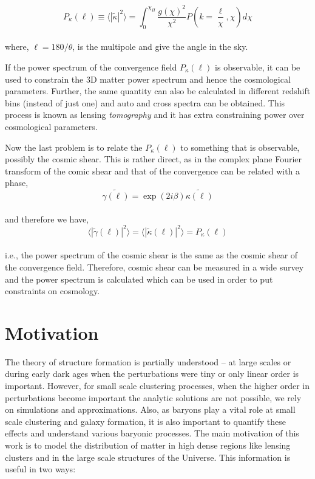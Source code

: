 \begin{equation}
	P_{\kappa}(\ell) \equiv \langle |\tilde{\kappa}|^2 \rangle = 
			\int_0^{\chi_H} \dfrac{g(\chi)^2}{\chi^2} 
			P\left(k=\dfrac{\ell}{\chi},\chi \right) d\chi
\end{equation}
\\
where, $\ell = 180/\theta$, is the multipole and give the angle in the sky. 

If the power spectrum of the convergence field $P_{\kappa}(\ell)$ is observable, it can be
used to constrain the 3D matter power spectrum and hence the cosmological parameters. Further,
the same quantity can also be calculated in different redshift bins (instead of just one) and
auto and cross spectra can be obtained. This process is known as 
lensing {\it tomography} and it has extra constraining power over cosmological parameters. 

Now the last problem is to relate the $P_{\kappa}(\ell)$ to something that is observable, 
possibly the cosmic shear. This is rather direct, as in the complex plane Fourier transform
of the comic shear and that of the
convergence can be related with a phase,
\begin{equation}
	\tilde{\gamma(\ell)} = \exp(2i\beta) \tilde{\kappa(\ell)}
\end{equation}
\\
and therefore we have,
\begin{equation}
	\langle |\tilde{\gamma}(\ell)|^2 \rangle = 
	\langle |\tilde{\kappa}(\ell)|^2 \rangle = P_{\kappa}(\ell)
\end{equation}
\\
i.e., the power spectrum of the cosmic shear is the same as the cosmic shear of the
convergence field. Therefore, cosmic shear can be measured in a wide survey and the 
power spectrum is calculated which can be used in order to put constraints on
cosmology.




\section{Motivation}

The theory of structure formation is partially understood --  at large scales 
or during early dark ages when the perturbations were tiny or only linear order is important. 
However, for small scale clustering processes, when the higher order in perturbations 
become important the analytic solutions are not possible, we rely on simulations and 
approximations. Also, as baryons play a vital role at small scale clustering
and galaxy formation, it is also important to quantify these effects and 
understand various baryonic processes. 
The main motivation of this work is to model the distribution of matter in high dense
regions like lensing clusters and in the large scale structures of the Universe. 
This information is useful in two ways: 

